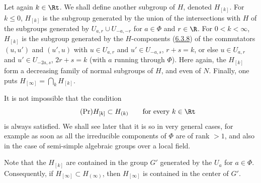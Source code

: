 \documentclass[12pt,a4paper,oneside,english]{smfart}
\makeatletter
\newcommand{\btanchor}[1]{\leavevmode\Hy@raisedlink{\hypertarget{bt:#1}{}}}
\newcommand{\btref}[1]{\hyperlink{bt:#1}{#1}}
\theoremstyle{definition}
\theoremstyle{bt}
\makeatother
\begin{document}
\btanchor{6.4.14}
Let again $k\in\Rt$. We shall define another subgroup of $H$, denoted
$H_{[k]}$. For $k\leq0$, $H_{[k]}$ is the subgroup generated by the union
of the intersections with $H$ of the subgroups generated by
$U_{a,r}\cup U_{-a,-r}$ for $a\in\Phi$ and $r\in\R$. For $0<k<\infty$,
$H_{[k]}$ is the subgroup generated by the $H$-components (\btref{6.3.8}) of the
commutators $(u,u')$ and $(u',u)$ with $u\in U_{a,r}$ and $u'\in U_{-a,s}$,
$r+s=k$, or else $u\in U_{a,r}$ and $u'\in U_{-2a,s}$, $2r+s=k$ (with $a$
running through $\Phi$). Here again, the $H_{[k]}$ form a decreasing family
of normal subgroups of $H$, and even of $N$. Finally, one puts
$H_{[\infty]}=\bigcap_k H_{[k]}$.

\btanchor{6.4.15}
It is not impossible that the condition
\begin{equation*}\tag{Pr}
  H_{[k]}\subset H_{(k)}\qquad\text{for every }k\in\Rt
\end{equation*}
is always satisfied. We shall see later that it is so in very general
cases, for example as soon as all the irreducible components of $\Phi$ are
of rank $>1$, and also in the case of semi-simple algebraic groups over a
local field.

Note that the $H_{[k]}$ are contained in the group $G'$ generated by the
$U_a$ for $a\in\Phi$. Consequently, if $H_{[\infty]}\subset H_{(\infty)}$,
then $H_{[\infty]}$ is contained in the center of $G'$.
\end{document}
